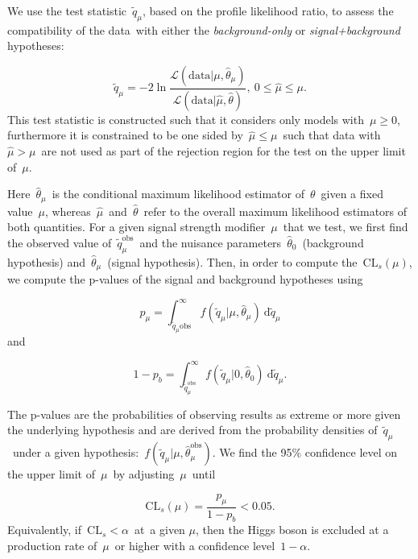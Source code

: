 We use the test statistic~$\tilde{q}_\mu$, based on the profile likelihood ratio\cite{Cowan:2010js}, to assess the compatibility of the data with either the \textit{background-only} or \textit{signal+background} hypotheses:

\begin{equation}
\tilde{q}_\mu = -2 \ln{\frac{\mathcal{L}(\mathrm{data} | \mu, \hat{\theta}_\mu)}{\mathcal{L}(\mathrm{data} | \hat{\mu}, \hat{\theta})}},\ 0 \le \hat{\mu} \le \mu.
\end{equation}
This test statistic is constructed such that it considers only models with~$\mu \ge 0$, furthermore it is constrained to be one sided by~$\hat{\mu} \le \mu$~such that data with~$\hat{\mu} > \mu$~are not used as part of the rejection region for the test on the upper limit of~$\mu$.

Here~$\hat{\theta}_\mu$~is the conditional maximum likelihood estimator of~$\theta$~given a fixed value~$\mu$, whereas~$\hat{\mu}$~and~$\hat{\theta}$~refer to the overall maximum likelihood estimators of both quantities. For a given signal strength modifier~$\mu$~that we test, we first find the observed value of~$\tilde{q}_\mu^{\mathrm{obs}}$~and the nuisance parameters~$\hat{\theta}_0$~(background hypothesis) and~$\hat{\theta}_\mu$~(signal hypothesis). Then, in order to compute the~$\mathrm{CL}_s(\mu)$, we compute the p-values of the signal and background hypotheses using

\begin{equation}
p_{\mu} = \int_{\tilde{q}_{\mu}{\mathrm{obs}}}^\infty f(\tilde{q}_{\mu} | \mu, \hat{\theta}_{\mu})\ \mathrm{d}\tilde{q}_\mu
\end{equation}
and

\begin{equation}
1 - p_b = \int_{\tilde{q}_{\mu}^{\mathrm{obs}}}^\infty f(\tilde{q}_{\mu} | 0, \hat{\theta}_0)\ \mathrm{d}\tilde{q}_{\mu}.
\end{equation}

The p-values are the probabilities of observing results as extreme or more given the underlying hypothesis and are derived from the probability densities of~$\tilde{q}_{\mu}$~under a given hypothesis:~$f(\tilde{q}_\mu | \mu, \hat{\theta}_\mu^{\mathrm{obs}})$. We find the 95\% confidence level on the upper limit of~$\mu$~by adjusting~$\mu$~until

\begin{equation}
\mathrm{CL}_s(\mu) = \frac{p_\mu}{1 - p_b} < 0.05.
\end{equation}
Equivalently, if~$\mathrm{CL}_s < \alpha$~at~a given $\mu$, then the Higgs boson is excluded at a production rate of~$\mu$~or higher with a confidence level~$1 - \alpha$.

